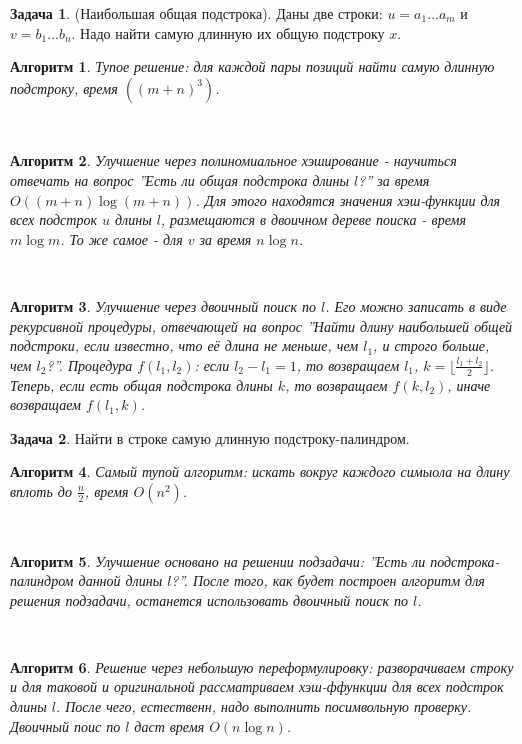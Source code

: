 \documentclass[a4paper]{article}
\theoremstyle{indented}
\newtheorem{alg}{Алгоритм}
\theoremstyle{definition}
\newtheorem{prob}{Задача}
\theoremstyle{remark}
\begin{document}
\begin{prob}
    (Наибольшая общая подстрока). Даны две строки: $u=a_1\ldots a_m$ и $v=b_1\ldots b_n$. Надо найти самую длинную их общую подстроку $x$. 
\end{prob}

\begin{alg}
    Тупое решение: для каждой пары позиций найти самую длинную подстроку, время $((m+n)^3)$. 
\end{alg} \

\begin{alg}
    Улучшение через полиномиальное хэширование - научиться отвечать на вопрос ''Есть ли общая подстрока длины $l$?'' за время $O((m+n)\log(m+n))$. Для этого находятся значения хэш-функции для всех подстрок $u$ длины $l$, размещаются в двоичном дереве поиска - время $m\log m$. То же самое - для $v$ за время $n\log n$. 
\end{alg} \

\begin{alg}
    Улучшение через двоичный поиск по $l$. Его можно записать в виде рекурсивной процедуры, отвечающей на вопрос ''Найти длину наибольшей общей подстроки, если известно, что её длина не меньше, чем $l_1$, и строго больше, чем $l_2$?''. Процедура $f(l_1, l_2)$: если $l_2-l_1=1$, то возвращаем $l_1$, $k=\lfloor \frac{l_1+l_2}{2}\rfloor$. Теперь, если есть общая подстрока длины $k$, то возвращаем $f(k, l_2)$, иначе возвращаем $f(l_1, k)$. 
\end{alg}

\begin{prob}
    Найти в строке самую длинную подстроку-палиндром.
\end{prob}

\begin{alg}
    Самый тупой алгоритм: искать вокруг каждого симыола на длину вплоть до $\frac{n}{2}$, время $O(n^2)$. 
\end{alg} \

\begin{alg}
    Улучшение основано на решении подзадачи: ''Есть ли подстрока-палиндром данной длины $l$?''. После того, как будет построен алгоритм для решения подзадачи, останется использовать двоичный поиск по $l$. 
\end{alg} \

\begin{alg}
    Решение через небольшую переформулировку: разворачиваем строку и для таковой и оригинальной рассматриваем хэш-ффункции для всех подстрок длины $l$. После чего, естественн, надо выполнить посимвольную проверку. Двоичный поис по $l$ даст время $O(n\log n)$. 
\end{alg}
\end{document}
